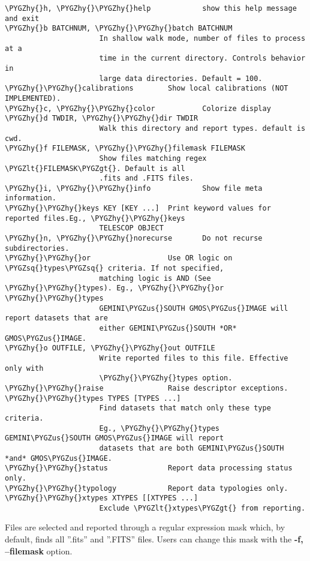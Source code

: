 \documentclass[letterpaper,10pt,english]{sphinxmanual}
\def\PYGZus{\char`\_}
\def\PYGZlt{\char`\<}
\def\PYGZgt{\char`\>}
\def\PYGZhy{\char`\-}
\def\PYGZsq{\char`\'}
\begin{document}
\begin{Verbatim}[commandchars=\\\{\}]
\PYGZhy{}h, \PYGZhy{}\PYGZhy{}help            show this help message and exit
\PYGZhy{}b BATCHNUM, \PYGZhy{}\PYGZhy{}batch BATCHNUM
                      In shallow walk mode, number of files to process at a
                      time in the current directory. Controls behavior in
                      large data directories. Default = 100.
\PYGZhy{}\PYGZhy{}calibrations        Show local calibrations (NOT IMPLEMENTED).
\PYGZhy{}c, \PYGZhy{}\PYGZhy{}color           Colorize display
\PYGZhy{}d TWDIR, \PYGZhy{}\PYGZhy{}dir TWDIR
                      Walk this directory and report types. default is cwd.
\PYGZhy{}f FILEMASK, \PYGZhy{}\PYGZhy{}filemask FILEMASK
                      Show files matching regex \PYGZlt{}FILEMASK\PYGZgt{}. Default is all
                      .fits and .FITS files.
\PYGZhy{}i, \PYGZhy{}\PYGZhy{}info            Show file meta information.
\PYGZhy{}\PYGZhy{}keys KEY [KEY ...]  Print keyword values for reported files.Eg., \PYGZhy{}\PYGZhy{}keys
                      TELESCOP OBJECT
\PYGZhy{}n, \PYGZhy{}\PYGZhy{}norecurse       Do not recurse subdirectories.
\PYGZhy{}\PYGZhy{}or                  Use OR logic on \PYGZsq{}types\PYGZsq{} criteria. If not specified,
                      matching logic is AND (See \PYGZhy{}\PYGZhy{}types). Eg., \PYGZhy{}\PYGZhy{}or \PYGZhy{}\PYGZhy{}types
                      GEMINI\PYGZus{}SOUTH GMOS\PYGZus{}IMAGE will report datasets that are
                      either GEMINI\PYGZus{}SOUTH *OR* GMOS\PYGZus{}IMAGE.
\PYGZhy{}o OUTFILE, \PYGZhy{}\PYGZhy{}out OUTFILE
                      Write reported files to this file. Effective only with
                      \PYGZhy{}\PYGZhy{}types option.
\PYGZhy{}\PYGZhy{}raise               Raise descriptor exceptions.
\PYGZhy{}\PYGZhy{}types TYPES [TYPES ...]
                      Find datasets that match only these type criteria.
                      Eg., \PYGZhy{}\PYGZhy{}types GEMINI\PYGZus{}SOUTH GMOS\PYGZus{}IMAGE will report
                      datasets that are both GEMINI\PYGZus{}SOUTH *and* GMOS\PYGZus{}IMAGE.
\PYGZhy{}\PYGZhy{}status              Report data processing status only.
\PYGZhy{}\PYGZhy{}typology            Report data typologies only.
\PYGZhy{}\PYGZhy{}xtypes XTYPES [[XTYPES ...]
                      Exclude \PYGZlt{}xtypes\PYGZgt{} from reporting.
\end{Verbatim}

Files are selected and reported through a regular expression mask which,
by default, finds all ''.fits'' and ''.FITS'' files. Users can change this mask
with the \textbf{-f, --filemask} option.
\end{document}
